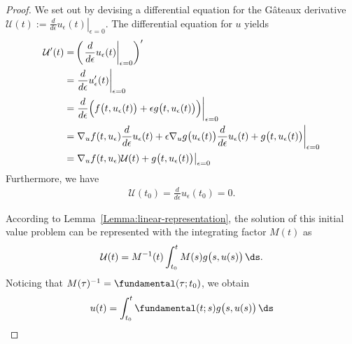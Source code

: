 

\begin{proof}
   We set out by devising a differential equation for the Gâteaux
  derivative $\mathcal U(t) := \left.\frac{d}{d\epsilon} u_\epsilon(t)\right|_{\epsilon=0}$. The differential equation for $u$ yields
  \begin{align*}
    \mathcal U'(t) =& \left( \left.\frac{d}{d\epsilon} u_\epsilon(t)\right|_{\epsilon=0} \right)' \\
    =& \left.\frac{d}{d\epsilon} u_\epsilon ' (t)\right|_{\epsilon=0} \\
    =& \left.\frac{d}{d\epsilon}
    \Bigl(f\bigl(t,u_\epsilon(t)\bigr)
    + \epsilon g\bigl(t,u_\epsilon(t)\bigr)\Bigr) \right|_{\epsilon=0} \\
    =& \left.\nabla_u f(t,u_\epsilon) \frac{d}{d\epsilon} u_\epsilon(t)
     + \epsilon \nabla_u g \bigl(u_\epsilon (t) \bigr) \frac{d}{d\epsilon} u_\epsilon(t) 
    + g\bigl(t,u_\epsilon(t)\bigr) \right|_{\epsilon=0}
  \\
    =& \left.\nabla_u f(t,u_\epsilon) \mathcal U(t)
    + g\bigl(t,u_\epsilon(t)\bigr) \right|_{\epsilon=0}
  \end{align*}
  Furthermore, we have
  \begin{gather*}
     \mathcal U(t_0) = \frac{d}{d\epsilon} u_\epsilon(t_0) = 0.
  \end{gather*}

  According to Lemma~\ref{Lemma:linear-representation}, the solution
  of this initial value problem can be represented with the
  integrating factor $M(t)$ as
  \begin{gather*}
    \mathcal U(t) = M^{-1}(t) \int_{t_0}^t M(s) g\bigl(s,u(s)\bigr)
    \, \ds.
  \end{gather*}
  Noticing that $M(\tau)^{-1} = \fundamental(\tau;t_0)$, we obtain
  \begin{gather*}
    u(t) = \int_{t_0}^t \fundamental(t;s) g\bigl(s,u(s)\bigr) \, \ds
\end{gather*}
\end{proof}



